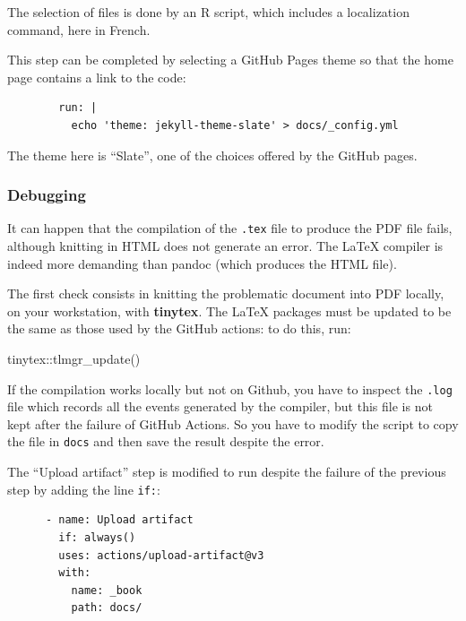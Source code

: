 \documentclass[
  12pt,
  american,
  a4paper,
  extrafontsizes,onecolumn,openright
  ]{memoir}
\newenvironment{Shaded}{\begin{snugshade}}{\end{snugshade}}
\newcommand{\FunctionTok}[1]{\textcolor[rgb]{0.00,0.00,0.00}{#1}}
\newcommand{\NormalTok}[1]{#1}
\newcommand{\SpecialCharTok}[1]{\textcolor[rgb]{0.00,0.00,0.00}{#1}}
\begin{document}
The selection of files is done by an R script, which includes a localization command, here in French.

This step can be completed by selecting a GitHub Pages theme so that the home page contains a link to the code:

\begin{verbatim}
        run: |
          echo 'theme: jekyll-theme-slate' > docs/_config.yml
\end{verbatim}

The theme here is \enquote{Slate}, one of the choices offered by the GitHub pages.

\hypertarget{debugging}{%
\subsubsection{Debugging}\label{debugging}}

It can happen that the compilation of the \texttt{.tex} file to produce the PDF file fails, although knitting in HTML does not generate an error.
The LaTeX compiler is indeed more demanding than pandoc (which produces the HTML file).

The first check consists in knitting the problematic document into PDF locally, on your workstation, with \textbf{tinytex}.
The LaTeX packages must be updated to be the same as those used by the GitHub actions: to do this, run:

\scriptsize

\begin{Shaded}
\begin{Highlighting}[]
\NormalTok{tinytex}\SpecialCharTok{::}\FunctionTok{tlmgr\_update}\NormalTok{()}
\end{Highlighting}
\end{Shaded}

\normalsize

If the compilation works locally but not on Github, you have to inspect the \texttt{.log} file which records all the events generated by the compiler, but this file is not kept after the failure of GitHub Actions.
So you have to modify the script to copy the file in \texttt{docs} and then save the result despite the error.

The \enquote{Upload artifact} step is modified to run despite the failure of the previous step by adding the line \texttt{if:}:

\begin{verbatim}
      - name: Upload artifact
        if: always()
        uses: actions/upload-artifact@v3
        with:
          name: _book
          path: docs/
\end{verbatim}
\end{document}
